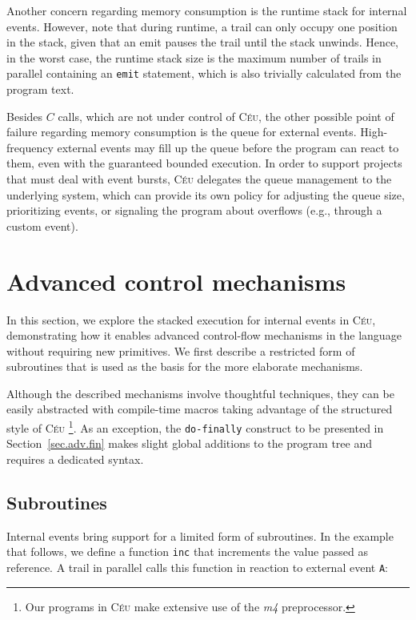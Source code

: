 \documentclass[preprint]{sigplanconf}
\newcommand{\CEU}{\textsc{C\'{e}u}\xspace}
\newcommand{\code}[1] {{\small{\texttt{#1}}}}
\newcommand{\DOFIN}{\code{do-finally}\xspace}
\newcommand{\1}{\;}
\newcommand{\2}{\;\;}
\newcommand{\3}{\;\;\;}
\newcommand{\5}{\;\;\;\;\;}
\begin{document}
Another concern regarding memory consumption is the runtime stack for internal 
events.
However, note that during runtime, a trail can only occupy one position in the 
stack, given that an emit pauses the trail until the stack unwinds.
Hence, in the worst case, the runtime stack size is the maximum number of 
trails in parallel containing an \code{emit} statement, which is also trivially 
calculated from the program text.

Besides $C$ calls, which are not under control of \CEU, the other possible 
point of failure regarding memory consumption is the queue for external events.
High-frequency external events may fill up the queue before the program can 
react to them, even with the guaranteed bounded execution.
In order to support projects that must deal with event bursts, \CEU delegates 
the queue management to the underlying system, which can provide its own policy 
for adjusting the queue size, prioritizing events, or signaling the program 
about overflows (e.g., through a custom event).

\newpage
\section{Advanced control mechanisms}
\label{sec.adv}

In this section, we explore the stacked execution for internal events in \CEU, 
demonstrating how it enables advanced control-flow mechanisms in the language 
without requiring new primitives.
We first describe a restricted form of subroutines that is used as the basis 
for the more elaborate mechanisms.

Although the described mechanisms involve thoughtful techniques, they can be 
easily abstracted with compile-time macros taking advantage of the structured 
style of \CEU%
\footnote{Our programs in \CEU make extensive use of the \emph{m4} 
preprocessor.}.
As an exception, the \DOFIN construct to be presented in 
Section~\ref{sec.adv.fin} makes slight global additions to the program tree and 
requires a dedicated syntax.

\subsection{Subroutines}
\label{sec.adv.sub}

Internal events bring support for a limited form of subroutines.
In the example that follows, we define a function \code{inc} that increments 
the value passed as reference.
A trail in parallel calls this function in reaction to external event \code{A}:
 
\end{document}

